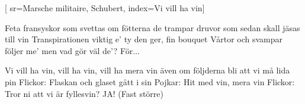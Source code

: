 

[ 		%
	sr={Marsche militaire, Schubert},					%
	index={Vi vill ha vin}]						%
	

\beginverse*						%
Feta fransyskor som svettas om fötterna
de trampar druvor som sedan skall jäsas till vin
Transpirationen viktig e’
ty den ger, fin bouquet
Vårtor och svampar följer me’
men vad gör väl de’?
För...
\endverse							%

\beginchorus						%
Vi vill ha vin, vill ha vin, vill ha mera vin
även om följderna bli att vi må lida pin
Flickor: Flaskan och glaset gått i sin
Pojkar: Hit med vin, mera vin
Flickor: Tror ni att vi är fyllesvin?
JA! (Fast större)
\endchorus							%
\endsong							%